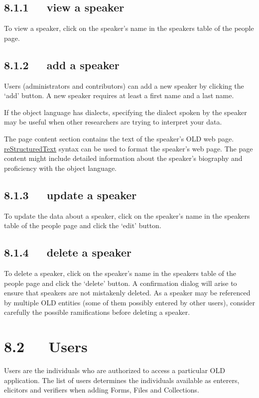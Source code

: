 \documentclass[letterpaper,10pt,english]{sphinxmanual}
\begin{document}
\subsection{8.1.1   view a speaker}
\label{user_guide:view-a-speaker}
To view a speaker, click on the speaker's name in the speakers table of the
people page.


\subsection{8.1.2   add a speaker}
\label{user_guide:add-a-speaker}
Users (administrators and contributors) can add a new speaker by clicking the
`add' button.  A new speaker requires at least a first name and a last name.

If the object language has dialects, specifying the dialect spoken by the
speaker may be useful when other researchers are trying to interpret your data.

The page content section contains the text of the speaker's OLD web page.
{\hyperref[user_guide:restructuredtext]{reStructuredText}} syntax can be used to format the speaker's web page.  The page
content might include detailed information about the speaker's biography and
proficiency with the object language.


\subsection{8.1.3   update a speaker}
\label{user_guide:update-a-speaker}
To update the data about a speaker, click on the speaker's name in the speakers
table of the people page and click the `edit' button.


\subsection{8.1.4   delete a speaker}
\label{user_guide:delete-a-speaker}
To delete a speaker, click on the speaker's name in the speakers table of the
people page and click the `delete' button.  A confirmation dialog will arise to
ensure that speakers are not mistakenly deleted.  As a speaker may be referenced
by multiple OLD entities (some of them possibly entered by other users),
consider carefully the possible ramifications before deleting a speaker.


\section{8.2   Users}
\label{user_guide:users}
Users are the individuals who are authorized to access a particular OLD
application.  The list of users determines the individuals available as
enterers, elicitors and verifiers when adding Forms, Files and Collections.
\end{document}
